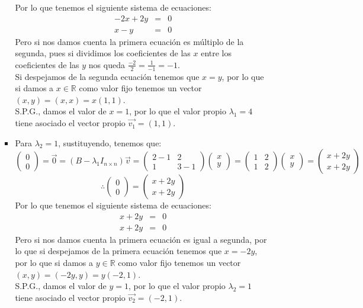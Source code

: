 \begin{itemize}
\begin{enumerate}
\begin{itemize}
Por lo que tenemos el siguiente sistema de ecuaciones:
\begin{eqnarray*}
-2x+2y&=&0\\
x-y&=&0
\end{eqnarray*}
Pero si nos damos cuenta la primera ecuaci\'on es m\'ultiplo de la segunda, pues si dividimos los coeficientes de las $x$ entre los coeficientes de las $y$ nos queda $\displaystyle\frac{-2}{2}=\frac{1}{-1}=-1$.\\
Si despejamos de la segunda ecuaci\'on tenemos que $x=y$, por lo que si damos a $x\in\mathbb{R}$ como valor fijo tenemos un vector $(x,y)=(x,x)=x(1,1)$.\\
S.P.G., damos el valor de $x=1$, por lo que el valor propio $\lambda_1=4$ tiene asociado el vector propio $\vec{v_1}=(1,1)$.

\item Para $\lambda_2=1$, sustituyendo, tenemos que:
    \[\begin{pmatrix}0\\
0\end{pmatrix}=\vec{0}=(B-\lambda_1I_{n\times n })\vec{v}=\begin{pmatrix}2-1 &2\\
1 &3-1\end{pmatrix}\begin{pmatrix}x\\
y\end{pmatrix}=\begin{pmatrix}1 &2\\
1 &2\end{pmatrix}\begin{pmatrix}x\\
y\end{pmatrix}=\begin{pmatrix}x+2y\\
x+2y\end{pmatrix}\]
\[\therefore \begin{pmatrix}0\\
0\end{pmatrix}=\begin{pmatrix}x+2y\\
x+2y\end{pmatrix}\]
Por lo que tenemos el siguiente sistema de ecuaciones:
\begin{eqnarray*}
x+2y&=&0\\
x+2y&=&0
\end{eqnarray*}
Pero si nos damos cuenta la primera ecuaci\'on es igual a segunda, por lo que si despejamos de la primera ecuaci\'on tenemos que $x=-2y$, por lo que si damos a $y\in\mathbb{R}$ como valor fijo tenemos un vector $(x,y)=(-2y,y)=y(-2,1)$.\\
S.P.G., damos el valor de $y=1$, por lo que el valor propio $\lambda_2=1$ tiene asociado el vector propio $\vec{v_2}=(-2,1)$.


\end{itemize}
\end{enumerate}
\end{itemize}
